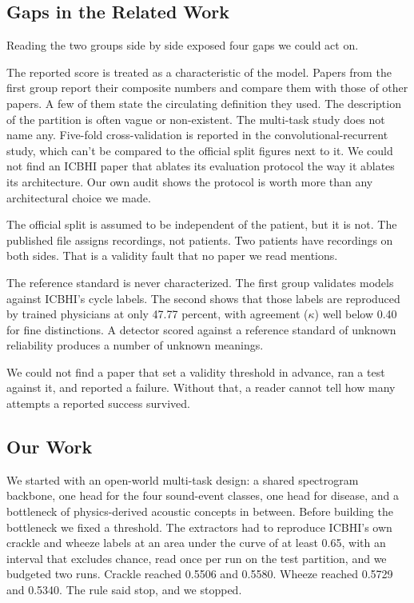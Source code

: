 \documentclass[journal,onecolumn]{IEEEtran}
\begin{document}
\subsection{Gaps in the Related Work}
\label{subsec:gaps}

Reading the two groups side by side exposed four gaps we could act on.

The reported score is treated as a characteristic of the model. Papers from the first
group report their composite numbers and compare them with those of other papers. A
few of them state the circulating definition they used. The description of the
partition is often vague or non-existent. The multi-task study does not name any.
Five-fold cross-validation is reported in the convolutional-recurrent study, which
can't be compared to the official split figures next to it. We could not find an ICBHI
paper that ablates its evaluation protocol the way it ablates its architecture. Our own
audit shows the protocol is worth more than any architectural choice we made.

The official split is assumed to be independent of the patient, but it is not. The
published file assigns recordings, not patients. Two patients have recordings on both
sides. That is a validity fault that no paper we read mentions.

The reference standard is never characterized. The first group validates models
against ICBHI's cycle labels. The second shows that those labels are reproduced by
trained physicians at only 47.77 percent, with agreement ($\kappa$) well below 0.40 for
fine distinctions. A detector scored against a reference standard of unknown
reliability produces a number of unknown meanings.

We could not find a paper that set a validity threshold in advance, ran a test against it, and reported a failure. Without that, a reader cannot tell how many attempts a reported success survived.

\subsection{Our Work}
\label{subsec:ourwork}

We started with an open-world multi-task design: a shared spectrogram backbone, one head for
the four sound-event classes, one head for disease, and a bottleneck of physics-derived
acoustic concepts in between. Before building the bottleneck we fixed a threshold. The
extractors had to reproduce ICBHI's own crackle and wheeze labels at an area under the curve of
at least 0.65, with an interval that excludes chance, read once per run on the test partition,
and we budgeted two runs. Crackle reached 0.5506 and 0.5580. Wheeze reached 0.5729 and
0.5340. The rule said stop, and we stopped.
\end{document}
